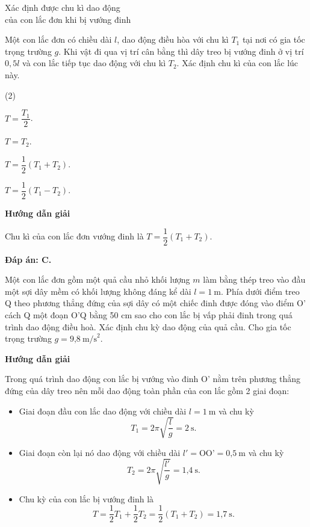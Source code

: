 \begin{dang}{Xác định được chu kì dao động\\ của con lắc đơn khi bị vướng đinh}
	{
		Một con lắc đơn có chiều dài $l$, dao động điều hòa với chu kì $T_1$ tại nơi có gia tốc trọng trường $g$. Khi vật đi qua vị trí cân bằng thì dây treo bị vướng đinh ở vị trí $0,5l$ và con lắc tiếp tục dao động với chu kì $T_2$. Xác định chu kì của con lắc lúc này.
		\begin{mcq}(2)
			\item $T=\dfrac{T_1}{2}$.
			\item $T=T_2$.
			\item $T=\dfrac{1}{2}(T_1+T_2)$.
			\item $T=\dfrac{1}{2}(T_1-T_2)$.
		\end{mcq}
	}
	{
		\begin{center}
			\textbf{Hướng dẫn giải}
		\end{center}
		
		Chu kì của con lắc đơn vướng đinh là $T=\dfrac{1}{2}(T_1+T_2)$.
		
		\textbf{Đáp án: C.}
	}
	
	{
		Một con lắc đơn gồm một quả cầu nhỏ khối lượng $m$ làm bằng thép treo vào đầu một sợi dây mềm có khối lượng không đáng kể dài $l = 1\ \text{m}$. Phía dưới điểm treo Q theo phương thẳng đứng của sợi dây có một chiếc đinh được đóng vào điểm O’ cách Q một đoạn O’Q bằng 50 cm sao cho con lắc bị vấp phải đinh trong quá trình dao động điều hoà. Xác định chu kỳ dao động của quả cầu. Cho gia tốc trọng trường $g = \text{9,8}\ \text{m/s}^2$.
	}
	{\begin{center}
			\textbf{Hướng dẫn giải}
		\end{center}
		
		Trong quá trình dao động con lắc bị vướng vào đinh O’ nằm  trên phương thẳng đứng của dây treo nên mỗi dao động toàn phần của con lắc gồm 2 giai đoạn:
		\begin{itemize}
			\item Giai đoạn đầu con lắc dao động với chiều dài $l = 1\ \text{m}$ và chu kỳ 
			\begin{equation*}
				T_1 =2\pi \sqrt{\dfrac{l}{g}} =2\ \text{s}.
			\end{equation*}
			\item Giai đoạn còn lại nó dao động với chiều dài $l'=\text{OO'} = \text{0,5}\ \text{m}$ và chu kỳ
			\begin{equation*}
				T_2 =2\pi \sqrt{\dfrac{l'}{g}}=\text{1,4}\ \text{s}.
			\end{equation*}
			\item Chu kỳ của con lắc bị vướng đinh là
			\begin{equation*}
				T=\dfrac{1}{2}T_1 +\dfrac{1}{2}T_2 = \dfrac{1}{2} (T_1 + T_2)=\text{1,7}\ \text{s}.
			\end{equation*}
			
		\end{itemize}
	}
\end{dang}
